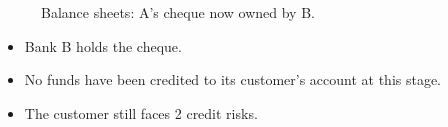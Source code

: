 \documentclass[20pt]{article}
\begin{document}
\begin{center}
\begin{figure}[H]
\begin{center}
\end{center}
\caption{Balance sheets: A's cheque now owned by B.}
\end{figure}
\end{center}

\begin{itemize}
    \item Bank B holds the cheque.
    \item No funds have been credited to its customer's account at this stage.
    \item The customer still faces 2 credit risks.
\end{itemize}

\end{document}
